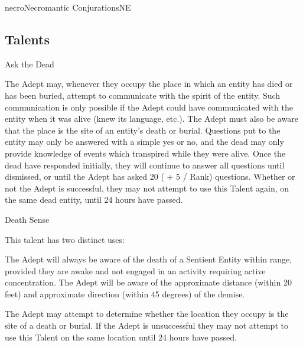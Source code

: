 \begin{college}[1.1]{necro}{Necromantic Conjurations}{NE}
\subsection{Talents}

\begin{talent}[T-1]{Ask the Dead}

\begin{effects}
The Adept may, whenever they occupy the place in which an entity has
died or has been buried, attempt to communicate with the spirit of the
entity.  Such communication is only possible if the Adept could have
communicated with the entity when it was alive (knew its language,
etc.).  The Adept must also be aware that the place is the site of an
entity's death or burial.  Questions put to the entity may only be
answered with a simple yes or no, and the dead may only provide
knowledge of events which transpired while they were alive.  Once the
dead have responded initially, they will continue to answer all
questions until dismissed, or until the Adept has asked 20 ( + 5 /
Rank) questions.  Whether or not the Adept is successful, they may not
attempt to use this Talent again, on the same dead entity, until 24
hours have passed.
\end{effects}
\end{talent}

\begin{talent}[T-2]{Death Sense}

\begin{effects}
This talent has two distinct uses:
\begin{Enumerate}
\item
The Adept will always be aware of the death of a Sentient Entity
within range, provided they are awake and not engaged in an activity
requiring active concentration.  The Adept will be aware of the
approximate distance (within 20 feet) and approximate direction
(within 45 degrees) of the demise.
\item
The Adept may attempt to determine whether the location they occupy is
the site of a death or burial.  If the Adept is unsuccessful they may
not attempt to use this Talent on the same location until 24 hours
have passed.
\end{Enumerate}
\end{effects}
\end{talent}


\end{college}
